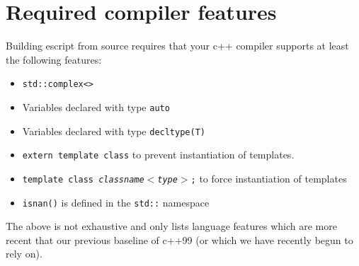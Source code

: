 \chapter{Required compiler features}
\label{app:cxxfeatures}

Building escript from source requires that your c++ compiler supports at least the following features:
\begin{itemize}
 \item \texttt{std::complex<>}
 \item Variables declared with type \texttt{auto}
 \item Variables declared with type \texttt{decltype(T)}
 \item \texttt{extern template class} to prevent instantiation of templates. 
 \item \texttt{template class \textit{classname$<$type$>$};} to force instantiation of templates
 \item \texttt{isnan()} is defined in the \texttt{std::} namespace
\end{itemize}
The above is not exhaustive and only lists language features which are more recent that our previous baseline of c++99 (or which
we have recently begun to rely on).
